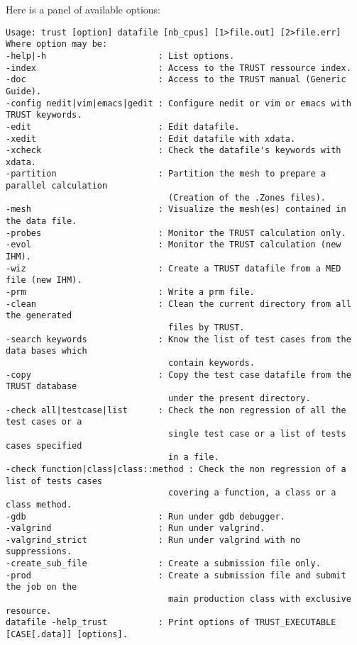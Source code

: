 Here is a panel of available options:
\begin{verbatim}
Usage: trust [option] datafile [nb_cpus] [1>file.out] [2>file.err]
Where option may be:
-help|-h                      : List options.
-index                        : Access to the TRUST ressource index.
-doc                          : Access to the TRUST manual (Generic Guide).
-config nedit|vim|emacs|gedit : Configure nedit or vim or emacs with TRUST keywords.
-edit                         : Edit datafile.
-xedit                        : Edit datafile with xdata.
-xcheck                       : Check the datafile's keywords with xdata.
-partition                    : Partition the mesh to prepare a parallel calculation 
                                (Creation of the .Zones files).
-mesh                         : Visualize the mesh(es) contained in the data file.
-probes                       : Monitor the TRUST calculation only.
-evol                         : Monitor the TRUST calculation (new IHM).
-wiz                          : Create a TRUST datafile from a MED file (new IHM).
-prm                          : Write a prm file.
-clean                        : Clean the current directory from all the generated 
                                files by TRUST.
-search keywords              : Know the list of test cases from the data bases which 
                                contain keywords.
-copy                         : Copy the test case datafile from the TRUST database 
                                under the present directory. 
-check all|testcase|list      : Check the non regression of all the test cases or a 
                                single test case or a list of tests cases specified 
                                in a file.
-check function|class|class::method : Check the non regression of a list of tests cases
                                covering a function, a class or a class method.
-gdb                          : Run under gdb debugger.
-valgrind                     : Run under valgrind.
-valgrind_strict              : Run under valgrind with no suppressions. 
-create_sub_file              : Create a submission file only. 
-prod                         : Create a submission file and submit the job on the 
                                main production class with exclusive resource. 
datafile -help_trust          : Print options of TRUST_EXECUTABLE [CASE[.data]] [options]. 
\end{verbatim}





